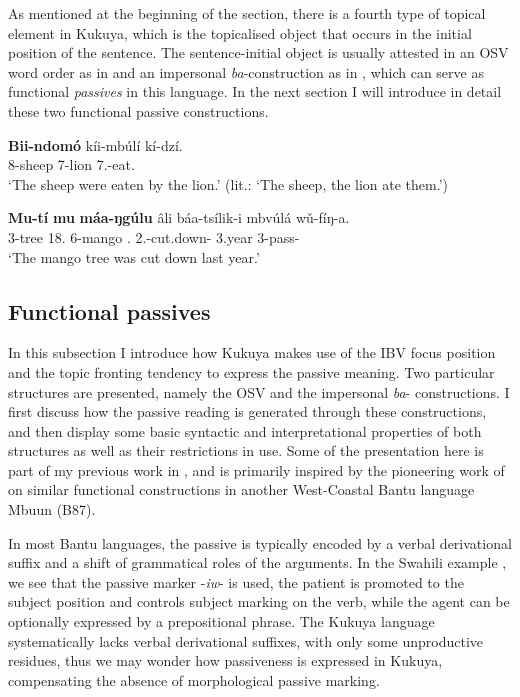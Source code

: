 \documentclass[output=paper,colorlinks,citecolor=brown,
]{langscibook}
\begin{document}
As mentioned at the beginning of the section, there is a fourth type of topical element in Kukuya, which is the topicalised object that occurs in the initial position of the sentence. The sentence-initial object is usually attested in an OSV word order as in  and an impersonal \textit{ba}-construction as in , which can serve as functional \textit{passives} in this language. In the next section I will introduce in detail these two functional passive constructions.
\largerpage[-1]

\begin{exe}
\ex
\label{113}
\gll
\textbf{Bii-ndomó}	kíi-mbúlí	kí-dzí.\\
8-sheep	7-lion	7\Sm{}.\Pst{}-eat.\Pst{}\\
\trans ‘The sheep were eaten by the lion.’ (lit.: `The sheep, the lion ate them.')

\ex
\label{114}
\gll
\textbf{Mu-tí}	\textbf{mu}	\textbf{máa-ŋgúlu}	\^{a}li	báa-tsílik-i	mbvúlá  wǔ-fíŋ-a.\\
3-tree 18.\Conn{} 6-mango \Aux{}.\Rpst{} 2\Sm{}.\Pst{}-cut.down-\Pst{} 3.year 3\Rel{}-pass-\Fv{}\\
\trans ‘The mango tree was cut down last year.’

\end{exe}
\subsection{Functional passives}\label{teke:sec:4.2}
In this subsection I introduce how Kukuya makes use of the IBV focus position and the topic fronting tendency to express the passive meaning. Two particular structures are presented, namely the OSV and the impersonal \textit{ba}- constructions. I first discuss how the passive reading is generated through these constructions, and then display some basic syntactic and interpretational properties of both structures as well as their restrictions in use. Some of the presentation here is part of my previous work in \citet{Li2020}, and is primarily inspired by the pioneering work of \citet{BostoenMundeke2011} on similar functional constructions in another West-Coastal Bantu language Mbuun (B87).

In most Bantu languages, the passive is typically encoded by a verbal derivational suffix and a shift of grammatical roles of the arguments. In the Swahili example , we see that the passive marker \mbox{-\textit{iw}-} is used, the patient is promoted to the subject position and controls subject marking on the verb, while the agent can be optionally expressed by a prepositional phrase. The Kukuya language systematically lacks verbal derivational suffixes, with only some unproductive residues, thus we may wonder how passiveness is expressed in Kukuya, compensating the absence of morphological passive marking. 
\end{document}
